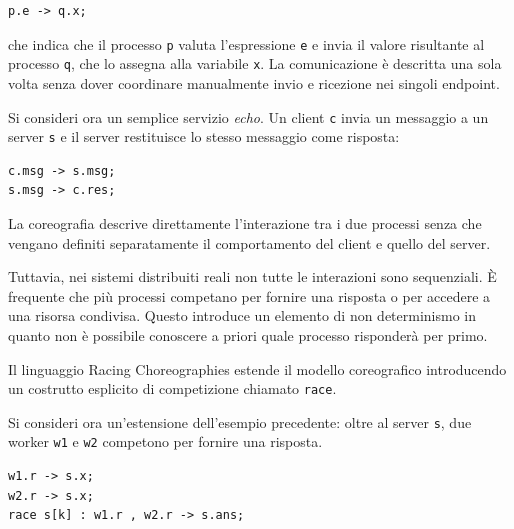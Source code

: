 \begin{tcolorbox}[
  colback=white,
  colframe=black!35,
  boxrule=0.4pt,
  arc=1mm,
  left=1.5mm,right=1.5mm,top=0.8mm,bottom=0.8mm
]
\begin{lstlisting}
p.e -> q.x;
\end{lstlisting}
\end{tcolorbox}

che indica che il processo \texttt{p} valuta l’espressione \texttt{e} e invia il valore risultante al processo \texttt{q}, che lo assegna alla variabile \texttt{x}. La comunicazione è descritta una sola volta senza dover coordinare manualmente invio e ricezione nei singoli endpoint.

\bigskip

Si consideri ora un semplice servizio \textit{echo}. Un client \texttt{c} invia un messaggio a un server \texttt{s} e il server restituisce lo stesso messaggio come risposta:

\begin{tcolorbox}[
  colback=white,
  colframe=black!35,
  boxrule=0.4pt,
  arc=1mm,
  left=1.5mm,right=1.5mm,top=0.8mm,bottom=0.8mm
]
\begin{lstlisting}
c.msg -> s.msg;
s.msg -> c.res;
\end{lstlisting}
\end{tcolorbox}

La coreografia descrive direttamente l’interazione tra i due processi senza che vengano definiti separatamente il comportamento del client e quello del server.

Tuttavia, nei sistemi distribuiti reali non tutte le interazioni sono sequenziali. È frequente che più processi competano per fornire una risposta o per accedere a una risorsa condivisa. Questo introduce un elemento di non determinismo in quanto non è possibile conoscere a priori quale processo risponderà per primo.

Il linguaggio Racing Choreographies estende il modello coreografico introducendo un costrutto esplicito di competizione chiamato \texttt{race}.

Si consideri ora un’estensione dell’esempio precedente: oltre al server \texttt{s}, due worker \texttt{w1} e \texttt{w2} competono per fornire una risposta.

\begin{tcolorbox}[
  colback=white,
  colframe=black!35,
  boxrule=0.4pt,
  arc=1mm,
  left=1.5mm,right=1.5mm,top=0.8mm,bottom=0.8mm
]
\begin{lstlisting}
w1.r -> s.x;
w2.r -> s.x;
race s[k] : w1.r , w2.r -> s.ans;
\end{lstlisting}
\end{tcolorbox}

